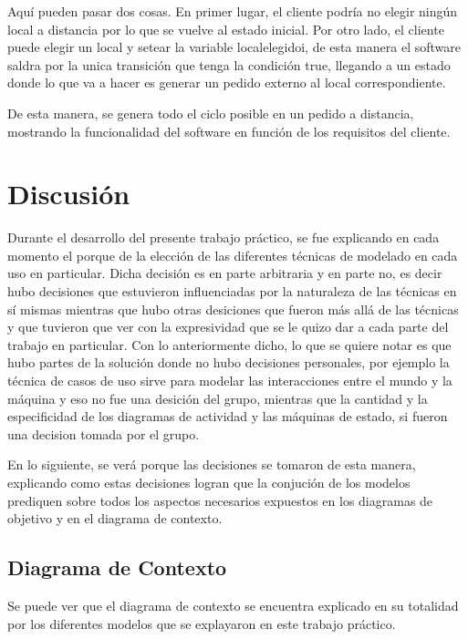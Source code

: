 \documentclass[a4paper,10pt]{article}
\begin{document}
Aqu\'i pueden pasar dos cosas. En primer lugar, el cliente podr\'ia no elegir ning\'un local a distancia por lo que se vuelve al estado inicial. Por otro lado, el cliente puede elegir un local y setear la variable localelegidoi, de esta manera el software saldra por la unica transici\'on que tenga la condici\'on true, llegando a un estado donde lo que va a hacer es generar un pedido externo al local correspondiente.

De esta manera, se genera todo el ciclo posible en un pedido a distancia, mostrando la funcionalidad del software en funci\'on de los requisitos del cliente.




\newpage


\section*{Discusi\'on}

Durante el desarrollo del presente trabajo pr\'actico, se fue explicando en cada momento el porque de la elecci\'on de las diferentes
t\'ecnicas de modelado en cada uso en particular. Dicha decisi\'on es en parte arbitraria y en parte no, es decir hubo decisiones que estuvieron
influenciadas por la naturaleza de las t\'ecnicas en s\'i mismas mientras que hubo otras desiciones que fueron m\'as all\'a de las t\'ecnicas
y que tuvieron que ver con la expresividad que se le quizo dar a cada parte del trabajo en particular. Con lo anteriormente dicho, lo que se quiere notar
es que hubo partes de la soluci\'on donde no hubo decisiones personales, por ejemplo la t\'ecnica de casos de uso sirve para modelar las interacciones
entre el mundo y la m\'aquina y eso no fue una desici\'on del grupo, mientras que la cantidad y la especificidad de los diagramas de actividad
y las m\'aquinas de estado, si fueron una decision tomada por el grupo.

En lo siguiente, se ver\'a porque las decisiones se tomaron de esta manera, explicando como estas decisiones logran que la conjuci\'on
de los modelos prediquen sobre todos los aspectos necesarios expuestos en los diagramas de objetivo y en el diagrama de contexto.

\subsection*{Diagrama de Contexto}
Se puede ver que el diagrama de contexto se encuentra explicado en su totalidad por los diferentes modelos que se explayaron en este trabajo pr\'actico.
\end{document}
